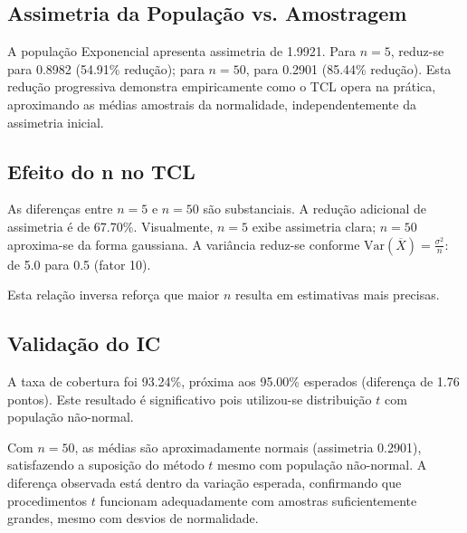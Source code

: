 \documentclass[12pt,a4paper]{article}
\begin{document}
\subsection{Assimetria da População vs. Amostragem}

A população Exponencial apresenta assimetria de 1.9921. Para $n = 5$, reduz-se para 0.8982 (54.91\% redução); para $n = 50$, para 0.2901 (85.44\% redução). Esta redução progressiva demonstra empiricamente como o TCL opera na prática, aproximando as médias amostrais da normalidade, independentemente da assimetria inicial.

\subsection{Efeito do n no TCL}

As diferenças entre $n = 5$ e $n = 50$ são substanciais. A redução adicional de assimetria é de 67.70\%. Visualmente, $n = 5$ exibe assimetria clara; $n = 50$ aproxima-se da forma gaussiana. A variância reduz-se conforme $\text{Var}(\overline{X}) = \frac{\sigma^2}{n}$: de 5.0 para 0.5 (fator 10). 

Esta relação inversa reforça que maior $n$ resulta em estimativas mais precisas.

\subsection{Validação do IC}

A taxa de cobertura foi 93.24\%, próxima aos 95.00\% esperados (diferença de 1.76 pontos). Este resultado é significativo pois utilizou-se distribuição $t$ com população não-normal. 

Com $n = 50$, as médias são aproximadamente normais (assimetria 0.2901), satisfazendo a suposição do método $t$ mesmo com população não-normal. A diferença observada está dentro da variação esperada, confirmando que procedimentos $t$ funcionam adequadamente com amostras suficientemente grandes, mesmo com desvios de normalidade.

\vspace{2cm}



\end{document}
